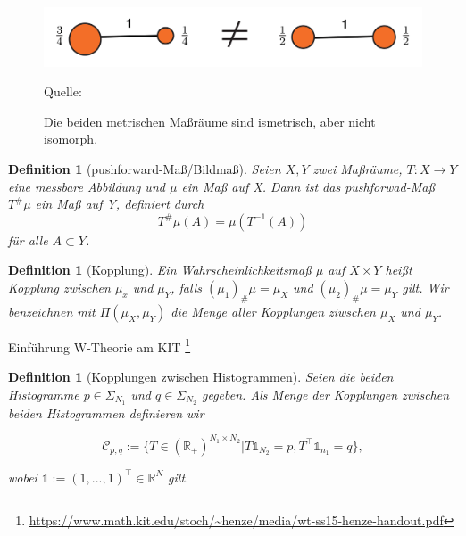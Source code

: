\documentclass[11pt,a4paper]{article}
\newcommand{\source}[1]{\caption*{\small \hfill Quelle: {#1}} }
\newtheorem{definition}[theorem]{Definition}
\numberwithin{equation}{section}
\begin{document}
\begin{figure}[ht]
	\centering
	\includegraphics[width=0.3\textheight]{example_mmspaces.png}
	\caption[Beispiel isometrischer metrischer Maßräume]{Die beiden metrischen Maßräume sind ismetrisch, aber nicht isomorph.}
	\source{\cite{COTcuturi}}
	\label{im:example_mmspaces}
\end{figure}

\begin{definition}[pushforward-Maß/Bildmaß]
	Seien $X,Y$ zwei Maßräume, $T: X \to Y$ eine messbare Abbildung und $\mu$ ein Maß auf X. Dann ist das pushforwad-Maß $T^\# \mu $ ein Maß auf Y, definiert durch \begin{equation}
	T^\# \mu (A) = \mu (T^{-1}(A))
	\end{equation}
	für alle $A \subset Y$.
\end{definition}
\begin{definition}[Kopplung]
	Ein Wahrscheinlichkeitsmaß $\mu$ auf $X \times Y$ heißt Kopplung zwischen $\mu_x$ und $\mu_Y$, falls $(\mu_1)_\#\mu = \mu_X$ und $(\mu_2)_\#\mu = \mu_Y$ gilt. Wir benzeichnen mit $\Pi(\mu_X,\mu_Y)$ die Menge aller Kopplungen ziwschen $\mu_X$ und $\mu_Y$.
\end{definition}
	
	
	Einführung W-Theorie am KIT \footnote{\url{https://www.math.kit.edu/stoch/~henze/media/wt-ss15-henze-handout.pdf}}
	\begin{definition}[Kopplungen zwischen Histogrammen]
		Seien die beiden Histogramme $p \in \Sigma_{N_1}$ und $q \in \Sigma_{N_2}$ gegeben.
		Als Menge der Kopplungen zwischen beiden Histogrammen definieren wir
		
		\begin{equation*}
		\mathcal{C}_{p,q} := \lbrace T \in (\mathbb{R}_+)^{N_1 \times N_2} | T \mathbb{1}_{N_2} = p, T^\top \mathbb{1}_{n_1} = q \rbrace,
		\end{equation*}	
		
		wobei $\mathbb{1} := (1,...,1)^\top \in \mathbb{R}^{N}$ gilt.
	\end{definition}
	
	
\end{document}

